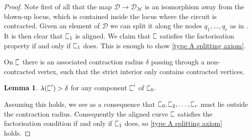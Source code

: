 \documentclass[11pt]{amsart}
\newcommand{\sqC}{\scalebox{0.8}[1.3]{$\sqsubset$}}
\renewcommand{\to}{\rightarrow}
\newcommand{\Mcal}{\mathcal{M}}
\newcommand{\Dcal}{\mathcal{D}}
\theoremstyle{definition}
\newtheorem{lemma}[thm]{Lemma}
\theoremstyle{definition}
\begin{document}
\begin{proof}
Note first of all that the map $\Dcal\to\Dcal_\Mcal$ is an isomorphism away from the blown-up locus, which is contained inside the locus where the circuit is contracted. Given an element of $\Dcal$ we can split it along the nodes $q_1,\ldots,q_r$ as in \cite{PuncturedMaps}. It is then clear that $\sqC_1$ is aligned. We claim that $\sqC$ satisfies the factorisation property if and only if $\sqC_1$ does. This is enough to show \eqref{type A splitting axiom}.

On $\sqC$ there is an associated contraction radius $\delta$ passing through a non-contracted vertex, such that the strict interior only contains contracted vertices.
\begin{lemma}\label{type A radius lemma}$\lambda(\sqC^\prime) > \delta$ for any component $\sqC^\prime$ of $\sqC_0$.\end{lemma}
\noindent Assuming this holds, we see as a consequence that $\sqC_0,\sqC_2,\ldots,\sqC_r$ must lie outside the contraction radius. Consequently the aligned curve $\sqC$ satisfies the factorisation condition if and only if $\sqC_1$ does, so \eqref{type A splitting axiom} holds.


\end{proof}
\end{document}
